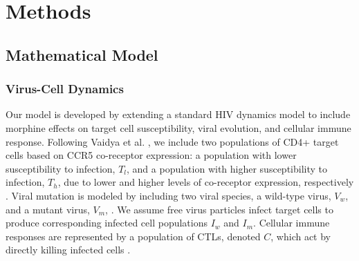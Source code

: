 \documentclass[11pt, oneside]{article}    %
\begin{document}
\section{Methods}

\subsection{Mathematical Model}

\subsubsection{Virus-Cell Dynamics}

Our model is developed by extending a standard HIV dynamics model \cite{Perelson, Schwartz} to include morphine effects on target cell susceptibility, viral evolution, and cellular immune response. Following Vaidya et al. \cite{Vaidya, Mutua}, we include two populations of CD4+ target cells based on CCR5 co-receptor expression: a population with lower susceptibility to infection, $T_l$, and a population with higher susceptibility to infection, $T_h$, due to lower and higher levels of co-receptor expression, respectively \cite{Kumar, Miyagi,Li}. Viral mutation is modeled by including two viral species, a wild-type virus, $V_w$,  and a mutant virus, $V_m$, \cite{Klein, McMichael}. We assume free virus particles infect target cells to produce corresponding infected cell populations $I_w$ and $I_m$.  Cellular immune responses are represented by a population of CTLs, denoted $C$, which act by directly killing infected cells \cite{Konrad, De Boer}. 



\end{document}
